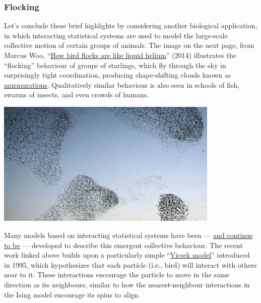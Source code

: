 \subsubsection*{Flocking}
Let's conclude these brief highlights by considering another biological application, in which interacting statistical systems are used to model the large-scale collective motion of certain groups of animals.
The image on the next page, from Marcus Woo, ``\href{https://www.sciencemag.org/news/2014/07/how-bird-flocks-are-liquid-helium}{How bird flocks are like liquid helium}'' (2014) illustrates the ``flocking'' behaviour of groups of starlings, which fly through the sky in surprisingly tight coordination, producing shape-shifting clouds known as \href{https://www.youtube.com/watch?v=V4f_1_r80RY}{murmurations}.
Qualitatively similar behaviour is also seen in schools of fish, swarms of insects, and even crowds of humans.

\begin{center}\includegraphics[width=0.8\textwidth]{figs/unit10_flock.pdf}\end{center}

Many models based on interacting statistical systems have been --- \href{https://doi.org/10.1038/s41467-022-29883-4}{and continue to be} --- developed to describe this emergent collective behaviour.
The recent work linked above builds upon a particularly simple ``\href{https://en.wikipedia.org/wiki/Vicsek_model}{Vicsek model}'' introduced in 1995, which hypothesizes that each particle (i.e., bird) will interact with others near to it.
These interactions encourage the particle to move in the same direction as its neighbours, similar to how the nearest-neighbour interactions in the Ising model encourage its spins to align.

